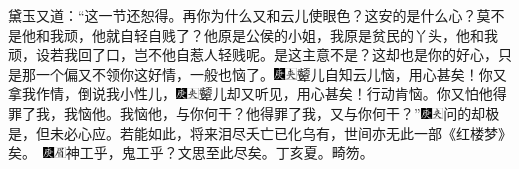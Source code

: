 黛玉又道：“这一节还恕得。再你为什么又和云儿使眼色？这安的是什么心？莫不是他和我顽，他就自轻自贱了？他原是公侯的小姐，我原是贫民的丫头，他和我顽，设若我回了口，岂不他自惹人轻贱呢。是这主意不是？这却也是你的好心，只是那一个偏又不领你这好情，一般也恼了。{\includegraphics[width=3mm]{../Images/00004}\includegraphics[width=3mm]{../Images/00012}\footnotesize \kaishu 颦儿自知云儿恼，用心甚矣！}你又拿我作情，倒说我小性儿，{\includegraphics[width=3mm]{../Images/00004}\includegraphics[width=3mm]{../Images/00012}\footnotesize \kaishu 颦儿却又听见，用心甚矣！}行动肯恼。你又怕他得罪了我，我恼他。我恼他，与你何干？他得罪了我，又与你何干？”{\includegraphics[width=3mm]{../Images/00004}\includegraphics[width=3mm]{../Images/00012}\footnotesize \kaishu 问的却极是，但未必心应。若能如此，将来泪尽夭亡已化乌有，世间亦无此一部《红楼梦》矣。　{\includegraphics[width=3mm]{../Images/00004}\includegraphics[width=3mm]{../Images/00010}\footnotesize \kaishu 神工乎，鬼工乎？文思至此尽矣。丁亥夏。畸笏。}}

